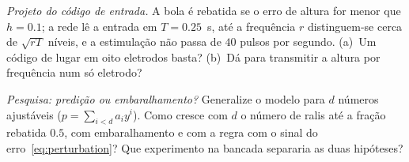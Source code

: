 \begin{exercise}[\lvlB]
\label{ex:22:6}
\emph{Projeto do código de entrada.} A bola é rebatida se o erro de altura for menor que $h=0.1$; a rede lê a entrada em $T=0.25$~s, até a frequência $r$ distinguem-se cerca de $\sqrt{rT}$ níveis, e a estimulação não passa de $40$ pulsos por segundo. (a)~Um código de lugar em oito eletrodos basta? (b)~Dá para transmitir a altura por frequência num só eletrodo?
\end{exercise}

\begin{exercise}[\lvlC]
\label{ex:22:7}
\emph{Pesquisa: predição ou embaralhamento?} Generalize o modelo para $d$ números ajustáveis ($p=\sum_{i<d}a_iy^i$). Como cresce com $d$ o número de ralis até a fração rebatida $0.5$, com embaralhamento e com a regra com o sinal do erro~\eqref{eq:perturbation}? Que experimento na bancada separaria as duas hipóteses?
\end{exercise}
